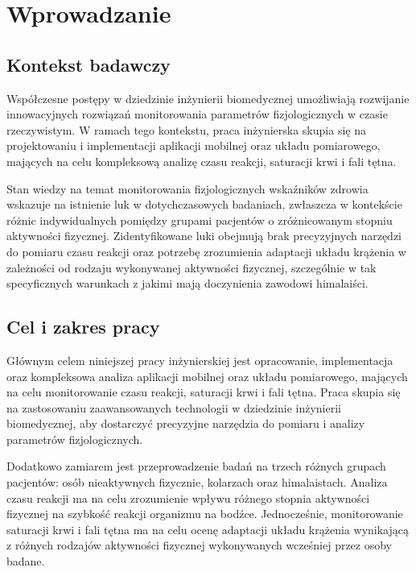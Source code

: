 \chapter{Wprowadzanie}
\section{Kontekst badawczy}
Współczesne postępy w dziedzinie inżynierii biomedycznej umożliwiają rozwijanie innowacyjnych rozwiązań monitorowania parametrów fizjologicznych w czasie rzeczywistym. W ramach tego kontekstu, praca inżynierska skupia się na projektowaniu i implementacji aplikacji mobilnej oraz układu pomiarowego, mających na celu kompleksową analizę czasu reakcji, saturacji krwi i fali tętna.

Stan wiedzy na temat monitorowania fizjologicznych wskaźników zdrowia wskazuje na istnienie luk w dotychczasowych badaniach, zwłaszcza w kontekście różnic indywidualnych pomiędzy grupami pacjentów o zróżnicowanym stopniu aktywności fizycznej. Zidentyfikowane luki obejmują brak precyzyjnych narzędzi do pomiaru czasu reakcji oraz potrzebę zrozumienia adaptacji układu krążenia w zależności od rodzaju wykonywanej aktywności fizycznej, szczególnie w tak specyficznych warunkach z jakimi mają doczynienia zawodowi himalaiści.
\section{Cel i zakres pracy}
Głównym celem niniejszej pracy inżynierskiej jest opracowanie, implementacja oraz kompleksowa analiza aplikacji mobilnej oraz układu pomiarowego, mających na celu monitorowanie czasu reakcji, saturacji krwi i fali tętna. Praca skupia się na zastosowaniu zaawansowanych technologii w dziedzinie inżynierii biomedycznej, aby dostarczyć precyzyjne narzędzia do pomiaru i analizy parametrów fizjologicznych.

Dodatkowo zamiarem jest przeprowadzenie badań na trzech różnych grupach pacjentów: osób nieaktywnych fizycznie, kolarzach oraz himalaistach. Analiza czasu reakcji ma na celu zrozumienie wpływu różnego stopnia aktywności fizycznej na szybkość reakcji organizmu na bodźce. Jednocześnie, monitorowanie saturacji krwi i fali tętna ma na celu ocenę adaptacji układu krążenia wynikającą z różnych rodzajów aktywności fizycznej wykonywanych wcześniej przez osoby badane.
